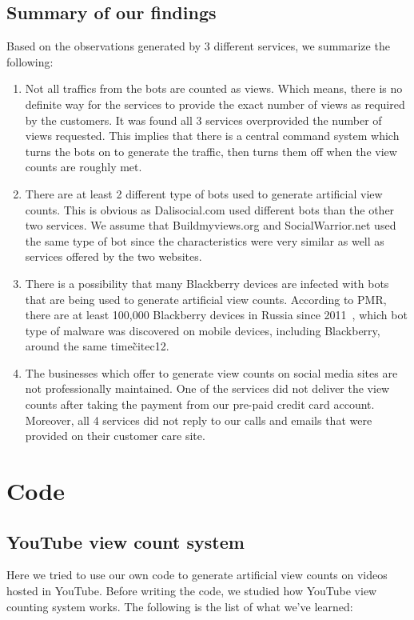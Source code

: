 \documentclass[conference]{IEEEtran}
\begin{document}
\subsection{Summary of our findings}

Based on the observations generated by 3 different services, we summarize the following:

\begin{enumerate}
  \item Not all traffics from the bots are counted as views. Which means, there is no definite way for the services to provide the exact number of views as required by the customers. It was found all 3 services overprovided the number of views requested. This implies that there is a central command system which turns the bots on to generate the traffic, then turns them off when the view counts are roughly met.
  \item There are at least 2 different type of bots used to generate artificial view counts. This is obvious as Dalisocial.com used different bots than the other two services. We assume that Buildmyviews.org and SocialWarrior.net used the same type of bot since the characteristics were very similar as well as services offered by the two websites.
  \item There is a possibility that many Blackberry devices are infected with bots that are being used to generate artificial view counts. According to PMR, there are at least 100,000 Blackberry devices in Russia since 2011~\cite{c13}, which bot type of malware was discovered on mobile devices, including Blackberry, around the same time\~cite{c12}.
  \item The businesses which offer to generate view counts on social media sites are not professionally maintained. One of the services did not deliver the view counts after taking the payment from our pre-paid credit card account. Moreover, all 4 services did not reply to our calls and emails that were provided on their customer care site.
\end{enumerate}

\section{Code}

\subsection{YouTube view count system}

Here we tried to use our own code to generate artificial view counts on videos hosted in YouTube. Before writing the code, we studied how YouTube view counting system works. The following is the list of what we’ve learned:
\end{document}
